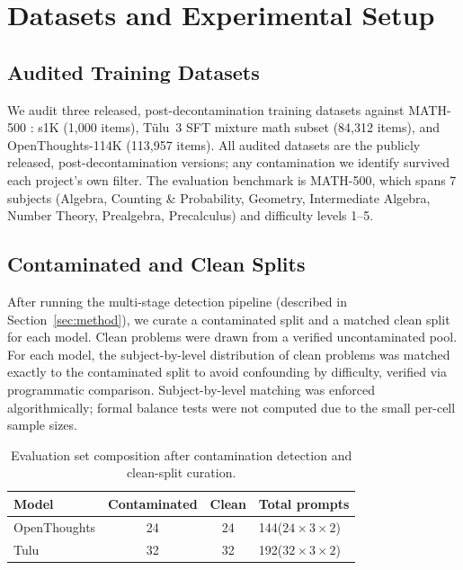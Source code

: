 \documentclass{article} %
\begin{document}
\section{Datasets and Experimental Setup}

\subsection{Audited Training Datasets}

We audit three released, post-decontamination training datasets against MATH-500 \citep{hendrycks2021math}: s1K (1,000 items), T\"ulu~3 SFT mixture math subset (84,312 items), and OpenThoughts-114K (113,957 items). All audited datasets are the publicly released, post-decontamination versions; any contamination we identify survived each project's own filter. The evaluation benchmark is MATH-500, which spans 7 subjects (Algebra, Counting \& Probability, Geometry, Intermediate Algebra, Number Theory, Prealgebra, Precalculus) and difficulty levels 1--5.

\subsection{Contaminated and Clean Splits}

After running the multi-stage detection pipeline (described in Section~\ref{sec:method}), we curate a contaminated split and a matched clean split for each model. Clean problems were drawn from a verified uncontaminated pool. For each model, the subject-by-level distribution of clean problems was matched exactly to the contaminated split to avoid confounding by difficulty, verified via programmatic comparison. Subject-by-level matching was enforced algorithmically; formal balance tests were not computed due to the small per-cell sample sizes.

\begin{table}[h]
\centering
\caption{Evaluation set composition after contamination detection and clean-split curation.}
\label{tab:dataset}
\begin{tabular}{lccl}
\toprule
\textbf{Model} & \textbf{Contaminated} & \textbf{Clean} & \textbf{Total prompts} \\
\midrule
OpenThoughts & 24 & 24 & 144\quad ($24 \times 3 \times 2$) \\
Tulu         & 32 & 32 & 192\quad ($32 \times 3 \times 2$) \\
\bottomrule
\end{tabular}
\end{table}
\end{document}
